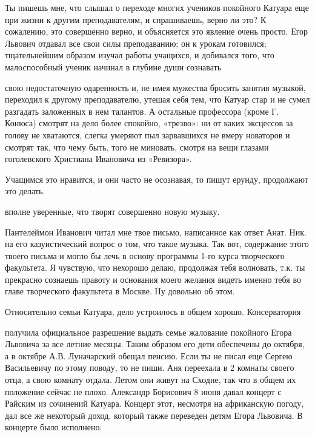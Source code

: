 Ты пишешь мне, что слышал о переходе многих учеников покойного Катуара еще при
жизни к другим преподавателям, и спрашиваешь, верно ли это? К сожалению, это
совершенно верно, и объясняется это явление очень просто. Егор Львович отдавал
все свои силы преподаванию; он к урокам готовился; тщательнейшим образом изучал
работы учащихся, и добивался того, что малоспособный ученик начинал в глубине
души сознавать


\noindent
свою недостаточную одаренность и, не имея мужества бросить занятия музыкой,
переходил к другому преподавателю, утешая себя тем, что Катуар стар и не сумел
разгадать заложенных в нем талантов. А остальные профессора (кроме Г. Конюса)
смотрят на дело более спокойно, «трезво»: ни от каких эксцессов за голову не
хватаются, слегка умеряют пыл зарвавшихся не вмеру новаторов и смотрят так, что
чему быть, того не миновать, смотря на вещи глазами гоголевского Христиана
Ивановича из «Ревизора».

Учащимся это нравится, и они часто не осознавая, то пишут ерунду, продолжают
это делать.


\noindent
вполне уверенные, что творят совершенно новую музыку.

Пантелеймон Иванович читал мне твое письмо, написанное как ответ Анат. Ник. на
его казуистический вопрос о том, что такое музыка. Так вот, содержание этого
твоего письма и могло бы лечь в основу программы 1-го курса творческого
факультета. Я чувствую, что нехорошо делаю, продолжая тебя волновать, т.к. ты
прекрасно сознаешь правоту и основания моего желания видеть именно тебя во
главе творческого факультета в Москве.
Ну довольно об этом.

Относительно семьи Катуара, дело устроилось в общем хорошо. Консерватория


\noindent
получила официальное разрешение выдать семье жалование покойного Егора Львовича
за все летние месяцы. Таким образом его дети обеспечены до октября, а в октябре
А.В. Луначарский обещал пенсию. Если ты не писал еще Сергею Васильевичу по
этому поводу, то не пиши. Аня переехала в 2 комнаты своего отца, а свою комнату
отдала. Летом они живут на Сходне, так что в общем их положение сейчас не
плохо. Александр Борисович 8 июня давал концерт с Райским из сочинений Катуара.
Концерт этот, несмотря на африканскую погоду, дал все же некоторый доход,
который также переведен детям Егора Львовича. В концерте было исполнено:

